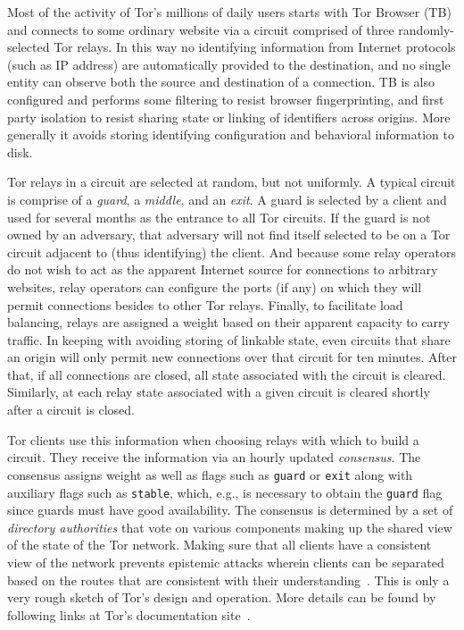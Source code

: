 Most of the activity of Tor's millions of daily users starts with Tor
Browser (TB) and connects to some ordinary website via a circuit
comprised of three randomly-selected Tor relays. In this way no
identifying information from Internet protocols (such as IP address)
are automatically provided to the destination, and no single entity
can observe both the source and destination of a connection. TB is
also configured and performs some filtering to resist browser
fingerprinting, and first party isolation to resist sharing state or
linking of identifiers across origins. More generally it avoids
storing identifying configuration and behavioral information to disk.

Tor relays in a circuit are selected at random, but not uniformly. A
typical circuit is comprise of a \emph{guard}, a \emph{middle}, and an
\emph{exit}. A guard is selected by a client and used for several
months as the entrance to all Tor circuits. If the guard is not owned
by an adversary, that adversary will not find itself selected to be on
a Tor circuit adjacent to (thus identifying) the client. And because
some relay operators do not wish to act as the apparent Internet
source for connections to arbitrary websites, relay operators can
configure the ports (if any) on which they will permit connections
besides to other Tor relays. Finally, to facilitate load balancing,
relays are assigned a weight based on their apparent capacity to carry
traffic. In keeping with avoiding storing of linkable state, even
circuits that share an origin will only permit new connections over
that circuit for ten minutes. After that, if all connections are
closed, all state associated with the circuit is cleared. Similarly,
at each relay state associated with a given circuit is cleared shortly
after a circuit is closed.

Tor clients use this information when choosing relays with which to
build a circuit. They receive the information via an hourly updated
\emph{consensus}. The consensus assigns weight as well as flags such
as \texttt{guard} or \texttt{exit} along with auxiliary flags such as
\texttt{stable}, which, e.g., is necessary to obtain the
\texttt{guard} flag since guards must have good availability. The
consensus is determined by a set of \emph{directory authorities} that
vote on various components making up the shared view of the state of
the Tor network. Making sure that all clients have a consistent view
of the network prevents epistemic attacks wherein clients can be
separated based on the routes that are consistent with their
understanding~\cite{danezis:pets2008}.  This is only a very rough
sketch of Tor's design and operation.  More details can be found by
following links at Tor's documentation site~\cite{tor-documentation}.


